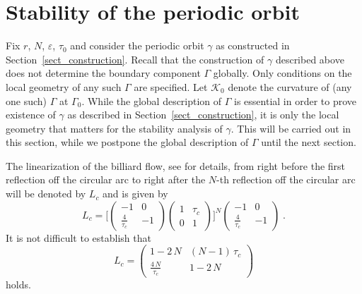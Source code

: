 \documentclass{amsart}
\theoremstyle{plain} %
\begin{document}
\section{Stability of the periodic orbit}
\label{sect_stability}

Fix $r$, $N$, $\varepsilon$, $\tau_0$ and consider the periodic orbit $\gamma$
as constructed in Section~\ref{sect_construction}. Recall that the
construction of $\gamma$ described above does not determine the
boundary component $\Gamma$ globally. Only conditions on
the local geometry of any such $\Gamma$ are specified.
Let ${\mathcal K}_0$ denote the curvature of (any one such)
$\Gamma$ at $\Gamma_0$.
While the global description of $\Gamma$ is essential in
order to prove existence of $\gamma$ as described in
Section~\ref{sect_construction}, it is only the local geometry that
matters for the stability analysis of $\gamma$. This will be carried
out in this section, while we postpone the global description of
$\Gamma$ until the next section.

The linearization of the billiard flow,
see \cite{MR2229799} for details, from right before the
first reflection off the circular arc to right after the $N$-th reflection
off the circular arc will be denoted by $L_c$ and is given by
\begin{equation*}
  L_c
  =
  \Big[
  \begin{pmatrix}
    -1 & 0 \\
    \frac{4}{\tau_c} & -1
  \end{pmatrix}
  \begin{pmatrix}
    1 & \tau_c \\
    0 & 1
  \end{pmatrix}
  \Big]^N
  \begin{pmatrix}
    -1 & 0 \\
    \frac{4}{\tau_c} & -1
  \end{pmatrix}
  \;.
\end{equation*}
It is not difficult to establish that
\begin{equation}
  \label{eqn_Lc}
  L_c
  =
  \begin{pmatrix}
    1 - 2\,N & (N-1)\,\tau_c \\
    \frac{4\,N}{\tau_c} & 1 - 2\,N
  \end{pmatrix}
\end{equation}
holds.
\end{document}

